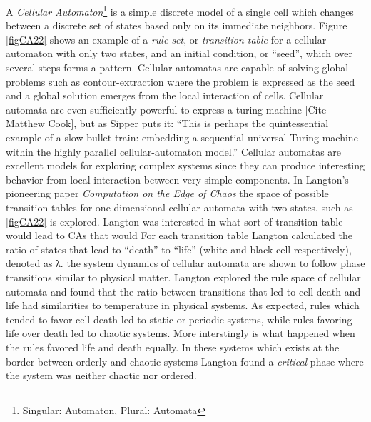 A \emph{Cellular Automaton}\footnote{Singular: Automaton, Plural: Automata}
is a simple discrete model of a single cell which changes between a discrete set
of states based only on its immediate neighbors.
Figure \ref{figCA22} shows an example of a \emph{rule set}, or \emph{transition
  table} for a cellular automaton with only two states, and an initial
condition, or ``seed'', which over several steps forms a pattern.
Cellular automatas are capable of solving global problems such as
contour-extraction \cite{sipper_emergence_1999} where the problem is expressed
as the seed and a global solution emerges from the local interaction of cells.
Cellular automata are even sufficiently powerful to express a turing machine
[Cite Matthew Cook],
but as Sipper puts it: ``This is perhaps the quintessential example of a slow
bullet train: embedding a sequential universal Turing machine within the
highly parallel cellular-automaton model.''
%
%
Cellular automatas are excellent models for exploring complex systems since they
can produce interesting behavior from local interaction between very simple
components.
%
In Langton's pioneering paper \emph{Computation on the Edge of Chaos}
\cite{langton_computation_1990} the space of possible transition tables for one
dimensional cellular automata with two states, such as \ref{figCA22} is explored.
Langton was interested in what sort of transition table would lead to CAs that
would 
%
For each transition table Langton calculated the ratio of states that lead to
``death'' to ``life'' (white and black cell respectively), denoted as λ.
the system dynamics of cellular automata are shown to follow phase transitions
similar to physical matter.
Langton explored the rule space of cellular automata and found that the ratio
between transitions that led to cell death and life had similarities to
temperature in physical systems.
As expected, rules which tended to favor cell death led to static or periodic
systems, while rules favoring life over death led to chaotic systems.
More interstingly is what happened when the rules favored life and death
equally.
In these systems which exists at the border between orderly and chaotic systems
Langton found a \emph{critical} phase where the system was neither chaotic nor
ordered.

